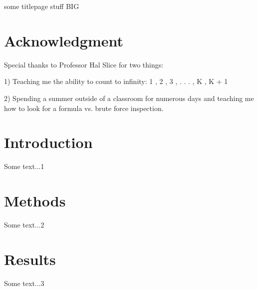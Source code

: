 \documentclass[letter,12pt]{report}
\begin{document}
    \pagestyle{empty} %
    \begin{titlepage}
        \begin{center}
            \begin{minipage}{1\textwidth}
                some titlepage stuff BIG
            \end{minipage}
        \end{center}
    \end{titlepage}
\pagebreak    
    \begin{abstract}
        [Abstract - fought the good fight]
    \end{abstract}
\pagebreak


\section*{Acknowledgment}

Special thanks to Professor Hal Slice for two things:
\newline
\par
1) Teaching me the ability to count to infinity:
\hfill
\newline
\hspace*{12mm} 1 , 2 , 3 , . . . , K , K + 1
\newline
\par
2) Spending a summer outside of a classroom for numerous days and teaching
me how to
\newline
\hspace*{12mm} look for a formula vs. brute force inspection.


\pagebreak
    
    \pagestyle{plain} %
    \setcounter{page}{1} %
    

    \tableofcontents

    \clearpage
   \pagebreak[4]
    \clearpage
    \begingroup
    \endgroup
    
    
    
     \clearpage
    \pagebreak[4]
    
    \section{Introduction}
    Some text...1
    \pagebreak
    
    
    \section{Methods}
    Some text...2
        \pagebreak
    
    \section{Results}
    Some text...3
        \pagebreak
    
\end{document}
